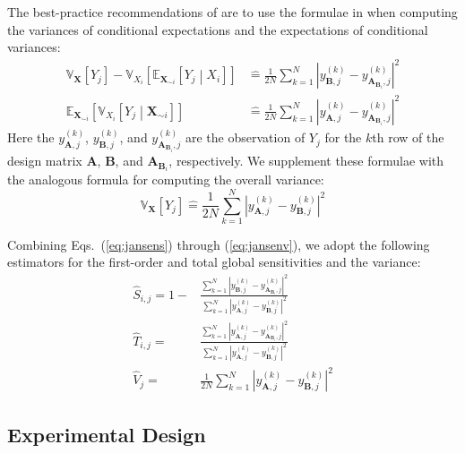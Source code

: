 \documentclass[12pt]{article}
\begin{document}
The best-practice recommendations of \citet{saltelli_variance_2010} are to use the formulae in \citet{jansen_analysis_1999} when computing the variances of conditional expectations and the expectations of conditional variances:
\begin{align}
    \mathbb{V}_\mathbf{X} \left[ Y_j \right] - \mathbb{V}_{X_i} \left[ \mathbb{E}_{\mathbf{X}_{\sim i}} \left[ Y_j \middle| X_i \right] \right] & \mathrel{\hat=} \frac{1}{2 N} \sum_{k=1}^N \left| y_{\mathbf{B},j}^{(k)} - y_{\mathbf{A}_{\mathbf{B}_i},j}^{(k)} \right|^2 \label{eq:jansens}
    \\
    \mathbb{E}_{\mathbf{X}_{\sim i}} \left[ \mathbb{V}_{X_i} \left[ Y_j \middle| \mathbf{X}_{\sim i} \right] \right] & \mathrel{\hat=} \frac{1}{2 N} \sum_{k=1}^N \left| y_{\mathbf{A},j}^{(k)} - y_{\mathbf{A}_{\mathbf{B}_i},j}^{(k)} \right|^2 \label{eq:jansent}
\end{align}
Here the $y_{\mathbf{A},j}^{(k)}$, $y_{\mathbf{B},j}^{(k)}$, and $y_{\mathbf{A}_{\mathbf{B}_i},j}^{(k)}$ are the observation of $Y_j$ for the $k$th row of the design matrix $\mathbf{A}$, $\mathbf{B}$, and $\mathbf{A}_{\mathbf{B}_i}$, respectively. We supplement these formulae with the analogous formula for computing the overall variance:
\begin{equation}
    \mathbb{V}_\mathbf{X} \left[ Y_j \right] \mathrel{\hat=} \frac{1}{2 N} \sum_{k=1}^N \left| y_{\mathbf{A},j}^{(k)} - y_{\mathbf{B},j}^{(k)} \right|^2 \label{eq:jansenv}
\end{equation}

Combining Eqs.~(\ref{eq:jansens}) through (\ref{eq:jansenv}), we adopt the following estimators for the first-order and total global sensitivities and the variance:
\begin{align}
    \hat{S}_{i,j} = 1 - & \frac{\sum_{k=1}^N \left| y_{\mathbf{B},j}^{(k)} - y_{\mathbf{A}_{\mathbf{B}_i},j}^{(k)} \right|^2}{\sum_{k=1}^N \left| y_{\mathbf{A},j}^{(k)} - y_{\mathbf{B},j}^{(k)} \right|^2} \label{eq:ours}
    \\
    \hat{T}_{i,j} = & \frac{\sum_{k=1}^N \left| y_{\mathbf{A},j}^{(k)} - y_{\mathbf{A}_{\mathbf{B}_i},j}^{(k)} \right|^2}{\sum_{k=1}^N \left| y_{\mathbf{A},j}^{(k)} - y_{\mathbf{B},j}^{(k)} \right|^2} \label{eq:ourt}
    \\
    \hat{V}_{j} = & \frac{1}{2 N} \sum_{k=1}^N \left| y_{\mathbf{A},j}^{(k)} - y_{\mathbf{B},j}^{(k)} \right|^2 \label{eq:ourv}
\end{align}


\subsection{Experimental Design}
\label{sec:design}
\end{document}
